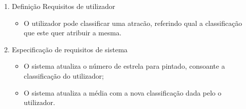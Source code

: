 \begin{enumerate}
    \item Definição Requisitos de utilizador
    \begin{itemize}
        \item O utilizador pode classificar uma atracão, referindo qual a classificação que este quer atribuir a mesma.
    \end{itemize}
    \item Especificação de requisitos de sistema
    \begin{itemize}
        \item O sistema atualiza o número de estrela para pintado, consoante a classificação do utilizador;
        \item O sistema atualiza a média com a nova classificação dada pelo o utilizador.
    \end{itemize}
\end{enumerate}